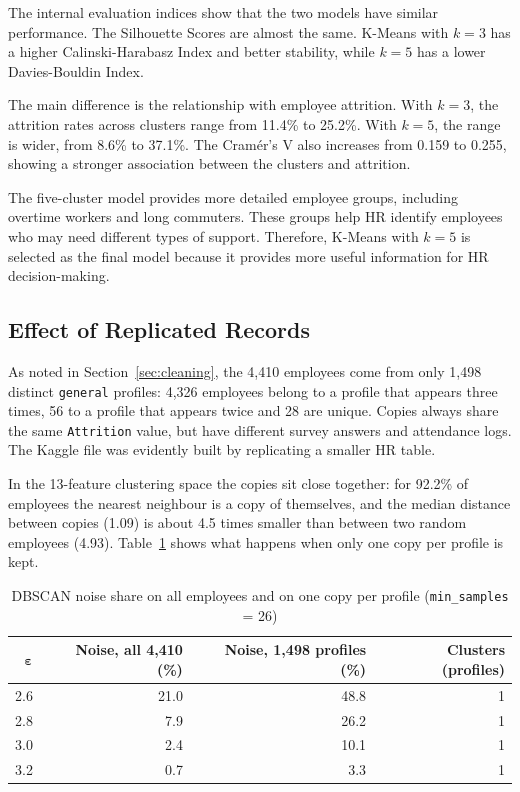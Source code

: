 \documentclass[12pt,a4paper]{article}
\begin{document}
The internal evaluation indices show that the two models
have similar performance. The Silhouette Scores are almost
the same. K-Means with $k=3$ has a higher Calinski-Harabasz
Index and better stability, while $k=5$ has a lower
Davies-Bouldin Index.

The main difference is the relationship with employee
attrition. With $k=3$, the attrition rates across clusters
range from 11.4\% to 25.2\%. With $k=5$, the range is wider,
from 8.6\% to 37.1\%. The Cramér's V also increases from
0.159 to 0.255, showing a stronger association between
the clusters and attrition.

The five-cluster model provides more detailed employee
groups, including overtime workers and long commuters.
These groups help HR identify employees who may need
different types of support. Therefore, K-Means with
$k=5$ is selected as the final model because it provides
more useful information for HR decision-making.
\subsection{Effect of Replicated Records}
\label{sec:replicated}

As noted in Section~\ref{sec:cleaning}, the 4,410 employees come from only
1,498 distinct \texttt{general} profiles: 4,326 employees belong to a profile
that appears three times, 56 to a profile that appears twice and 28 are
unique. Copies always share the same \texttt{Attrition} value, but have
different survey answers and attendance logs. The Kaggle file was evidently
built by replicating a smaller HR table.

In the 13-feature clustering space the copies sit close together: for 92.2\%
of employees the nearest neighbour is a copy of themselves, and the median
distance between copies (1.09) is about 4.5 times smaller than between two
random employees (4.93). Table~\ref{tab:replicated} shows what happens when
only one copy per profile is kept.

\begin{table}[H]
\centering
\caption{DBSCAN noise share on all employees and on one copy per profile
(\texttt{min\_samples} = 26)}
\label{tab:replicated}
\small
\begin{tabular}{rrrr}
\toprule
$\boldsymbol{\varepsilon}$ & \textbf{Noise, all 4,410 (\%)} & \textbf{Noise, 1,498 profiles (\%)}
& \textbf{Clusters (profiles)}\\
\midrule
2.6 & 21.0 & 48.8 & 1\\
2.8 & 7.9  & 26.2 & 1\\
3.0 & 2.4  & 10.1 & 1\\
3.2 & 0.7  & 3.3  & 1\\
\bottomrule
\end{tabular}
\end{table}
\end{document}
